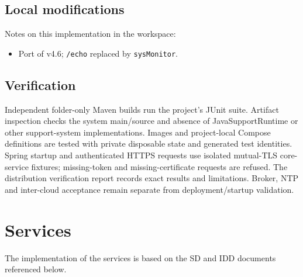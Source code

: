 \documentclass[a4paper]{arrowhead}
\begin{document}
\subsection{Local modifications}
\label{sec:local}

Notes on this implementation in the workspace:
\begin{itemize}
  \item Port of v4.6; \texttt{/\allowbreak{}echo} replaced by \texttt{sysMonitor}.
\end{itemize}

\subsection{Verification}

Independent folder-only Maven builds run the project's JUnit suite. Artifact inspection checks the system main/source and absence of JavaSupportRuntime or other support-system implementations. Images and project-local Compose definitions are tested with private disposable state and generated test identities. Spring startup and authenticated HTTPS requests use isolated mutual-TLS core-service fixtures; missing-token and missing-certificate requests are refused. The distribution verification report records exact results and limitations. Broker, NTP and inter-cloud acceptance remain separate from deployment/startup validation.

\newpage

\section{Services}
\label{sec:services}

The implementation of the services is based on the SD and IDD documents referenced below.
\end{document}
